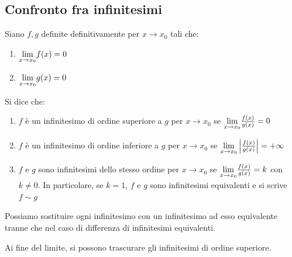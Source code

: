 \documentclass[12pt]{report}
\begin{document}
	\subsection{Confronto fra infinitesimi}
	Siano $f, g$ definite definitivamente per $x \to x_0$ tali che:
	\begin{enumerate}
		\item $\mathlarger{\lim_{x \to x_0}}f(x) = 0$
		\item $\mathlarger{\lim_{x \to x_0}}g(x) = 0$
	\end{enumerate}
	Si dice che:
	\begin{enumerate}
		\item $f$ è un infinitesimo di ordine superiore a $g$ per $x \to x_0$ se $\mathlarger{\lim_{x \to x_0}}\frac{f(x)}{g(x)} = 0$
		\item $f$ è un infinitesimo di ordine inferiore a $g$ per $x \to x_0$ se $\mathlarger{\lim_{x \to x_0}}\left|\frac{f(x)}{g(x)}\right|=+\infty$
		\item $f$ e $g$ sono infinitesimi dello stesso ordine per $x \to x_0$ se $\mathlarger{\lim_{x \to x_0}}\frac{f(x)}{g(x)} = k$ con $k \neq 0$. In particolare, se $k = 1$, $f$ e $g$ sono infinitesimi equivalenti e si scrive $f \sim g$
	\end{enumerate}
	\begin{note}{}{}
		Possiamo sostituire ogni infinitesimo con un infinitesimo ad esso equivalente tranne che nel caso di differenza di infinitesimi equivalenti.
	\end{note}
	Ai fine del limite, si possono trascurare gli infinitesimi di ordine superiore.
\end{document}
